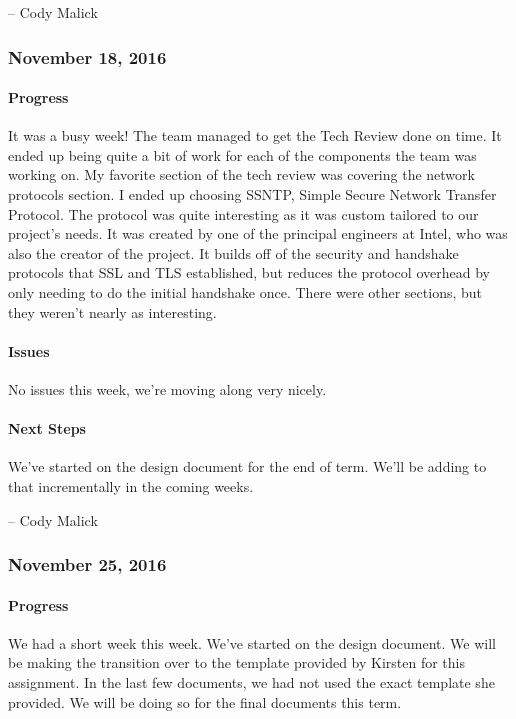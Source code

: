 \documentclass[10pt,onecolumn,journal,draftclsnofoot]{IEEEtran}
\begin{document}
-- Cody Malick

\subsubsection{November 18, 2016} 

\paragraph{Progress} 

It was a busy week! The team managed to get the Tech Review done on
time. It ended up being quite a bit of work for each of the components
the team was working on. My favorite section of the tech review was
covering the network protocols section. I ended up choosing SSNTP,
Simple Secure Network Transfer Protocol. The protocol was quite
interesting as it was custom tailored to our project's needs. It was
created by one of the principal engineers at Intel, who was also the
creator of the project. It builds off of the security and handshake
protocols that SSL and TLS established, but reduces the protocol
overhead by only needing to do the initial handshake once. There were
other sections, but they weren't nearly as interesting.

\paragraph{Issues} 

No issues this week, we're moving along very nicely.

\paragraph{Next Steps} 

We've started on the design document for the end of term. We'll be
adding to that incrementally in the coming weeks.

-- Cody Malick

\subsubsection{November 25, 2016} 

\paragraph{Progress} 

We had a short week this week. We've started on the design document. We
will be making the transition over to the template provided by Kirsten
for this assignment. In the last few documents, we had not used the
exact template she provided. We will be doing so for the final documents
this term.
\end{document}
